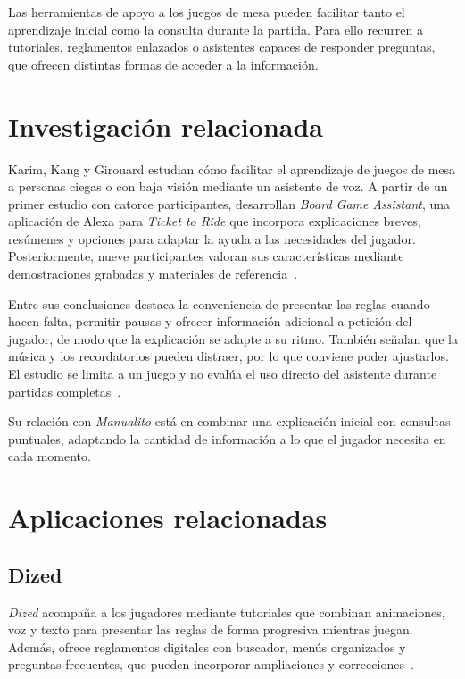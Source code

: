 
Las herramientas de apoyo a los juegos de mesa pueden facilitar tanto el
aprendizaje inicial como la consulta durante la partida. Para ello recurren
a tutoriales, reglamentos enlazados o asistentes capaces de responder
preguntas, que ofrecen distintas formas de acceder a la información.

\section{Investigación relacionada}
\label{relacionados:investigacion}

Karim, Kang y Girouard estudian cómo facilitar el aprendizaje de juegos de
mesa a personas ciegas o con baja visión mediante un asistente de voz. A
partir de un primer estudio con catorce participantes, desarrollan
\textit{Board Game Assistant}, una aplicación de Alexa para
\textit{Ticket to Ride} que incorpora explicaciones breves, resúmenes y
opciones para adaptar la ayuda a las necesidades del jugador. Posteriormente,
nueve participantes valoran sus características mediante demostraciones
grabadas y materiales de referencia~\cite{karim2023rulebook}.

Entre sus conclusiones destaca la conveniencia de presentar las reglas
cuando hacen falta, permitir pausas y ofrecer información adicional a
petición del jugador, de modo que la explicación se adapte a su ritmo.
También señalan que la música y los recordatorios pueden distraer, por lo
que conviene poder ajustarlos. El estudio se limita a un juego y no evalúa
el uso directo del asistente durante partidas completas~\cite{karim2023rulebook}.

Su relación con \textit{Manualito} está en combinar una explicación inicial
con consultas puntuales, adaptando la cantidad de información a lo que el
jugador necesita en cada momento.

\section{Aplicaciones relacionadas}
\label{relacionados:aplicaciones}

\subsection{Dized}
\label{relacionados:dized}

\textit{Dized} acompaña a los jugadores mediante tutoriales que combinan
animaciones, voz y texto para presentar las reglas de forma progresiva
mientras juegan. Además, ofrece reglamentos digitales con buscador,
menús organizados y preguntas frecuentes, que pueden incorporar
ampliaciones y correcciones~\cite{dized_funciones}.

